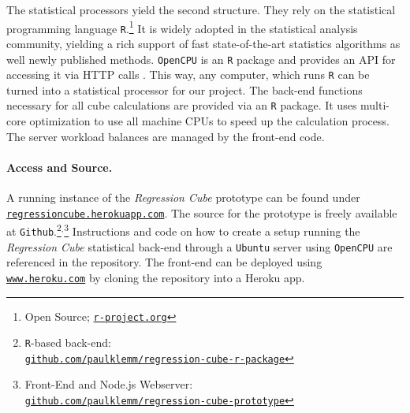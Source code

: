 \documentclass[journal]{style/vgtc} 			          %
\begin{document}
The statistical processors yield the second structure.
They rely on the statistical programming language \texttt{R}.\footnote{Open Source; \href{http://r-project.org}{\texttt{r-project.org}}}
It is widely adopted in the statistical analysis community, yielding a rich support of fast state-of-the-art statistics algorithms as well newly published methods.
\texttt{OpenCPU} is an \texttt{R} package and provides an API for accessing it via HTTP calls \cite{Ooms}.
This way, any computer, which runs \texttt{R} can be turned into a statistical processor for our project.
The back-end functions necessary for all cube calculations are provided via an \texttt{R} package.
It uses multi-core optimization to use all machine CPUs to speed up the calculation process.
The server workload balances are managed by the front-end code.

\paragraph{Access and Source.}
A running instance of the \emph{Regression Cube} prototype can be found under \href{http://regressioncube.herokuapp.com/}{\texttt{regressioncube.herokuapp.com}}.
The source for the prototype is freely available at \texttt{Github}.\footnote{\texttt{R}-based back-end: \href{https://github.com/paulklemm/regression-cube-r-package}{\\\texttt{github.com/paulklemm/regression-cube-r-package}}}$^{,}$\footnote{Front-End and Node.js Webserver: \href{https://github.com/paulklemm/regression-cube-prototype}{\texttt{\\github.com/paulklemm/regression-cube-prototype}}}
Instructions and code on how to create a setup running the \emph{Regression Cube} statistical back-end through a \texttt{Ubuntu} server using \texttt{OpenCPU} are referenced in the repository.
The front-end can be deployed using \href{https://www.heroku.com/}{\texttt{www.heroku.com}} by cloning the repository into a Heroku app.
\end{document}
